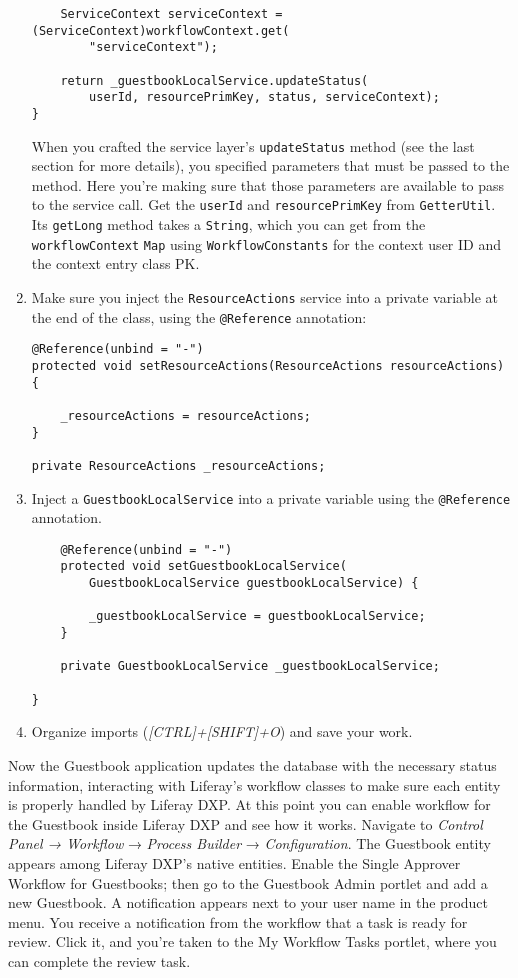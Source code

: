 \begin{enumerate}
\begin{verbatim}
    ServiceContext serviceContext = (ServiceContext)workflowContext.get(
        "serviceContext");

    return _guestbookLocalService.updateStatus(
        userId, resourcePrimKey, status, serviceContext);
}
\end{verbatim}

  When you crafted the service layer's \texttt{updateStatus} method (see
  the last section for more details), you specified parameters that must
  be passed to the method. Here you're making sure that those parameters
  are available to pass to the service call. Get the \texttt{userId} and
  \texttt{resourcePrimKey} from \texttt{GetterUtil}. Its
  \texttt{getLong} method takes a \texttt{String}, which you can get
  from the \texttt{workflowContext} \texttt{Map} using
  \texttt{WorkflowConstants} for the context user ID and the context
  entry class PK.
\item
  Make sure you inject the \texttt{ResourceActions} service into a
  private variable at the end of the class, using the
  \texttt{@Reference} annotation:

\begin{verbatim}
@Reference(unbind = "-")
protected void setResourceActions(ResourceActions resourceActions) {

    _resourceActions = resourceActions;
}

private ResourceActions _resourceActions;
\end{verbatim}
\item
  Inject a \texttt{GuestbookLocalService} into a private variable using
  the \texttt{@Reference} annotation.

\begin{verbatim}
    @Reference(unbind = "-")
    protected void setGuestbookLocalService(
        GuestbookLocalService guestbookLocalService) {

        _guestbookLocalService = guestbookLocalService;
    }

    private GuestbookLocalService _guestbookLocalService;

}
\end{verbatim}
\item
  Organize imports (\emph{{[}CTRL{]}+{[}SHIFT{]}+O}) and save your work.
\end{enumerate}

Now the Guestbook application updates the database with the necessary
status information, interacting with Liferay's workflow classes to make
sure each entity is properly handled by Liferay DXP. At this point you
can enable workflow for the Guestbook inside Liferay DXP and see how it
works. Navigate to \emph{Control Panel → Workflow} → \emph{Process
Builder} → \emph{Configuration}. The Guestbook entity appears among
Liferay DXP's native entities. Enable the Single Approver Workflow for
Guestbooks; then go to the Guestbook Admin portlet and add a new
Guestbook. A notification appears next to your user name in the product
menu. You receive a notification from the workflow that a task is ready
for review. Click it, and you're taken to the My Workflow Tasks portlet,
where you can complete the review task.

